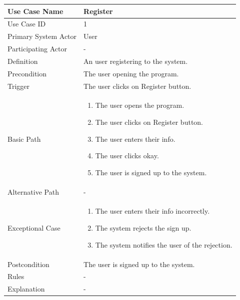 \documentclass[a4paper,12pt]{report}
\begin{document}
		\begin{tabular}{|m{4cm}|m{11.5cm}|}
			\hline
					Use Case Name & Register\\
				\hline
					Use Case ID & 1\\
				\hline
					Primary System Actor & User\\
				\hline
					Participating Actor & -\\
				\hline
					Definition & An user registering to the system.\\
				\hline
					Precondition & The user opening the program.\\
				\hline
					Trigger & The user clicks on Register button.\\
				\hline
					Basic Path & \begin{enumerate}
						\item The user opens the program.
						\item The user clicks on Register button.
						\item The user enters their info.
						\item The user clicks okay.
						\item The user is signed up to the system.
					\end{enumerate}		
					\\
				\hline
					Alternative Path & -\\
				\hline
					Exceptional Case & \begin{enumerate}
						\item The user enters their info incorrectly.
						\item The system rejects the sign up.
						\item The system notifies the user of the rejection.
					\end{enumerate}
					
					\\
				\hline
					Postcondition & The user is signed up to the system.\\
				\hline
					Rules & -\\
				\hline
					Explanation & -\\
			\hline
		\end{tabular}
\end{document}
